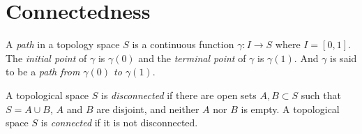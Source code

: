 \documentclass[a4paper,11pt]{article}
\begin{document}
\section{Connectedness}

\begin{defn}
  A \emph{path} in a topology space $S$ is a continuous function
  $\gamma : I\to S$ where $I=[0,1]$.  The \emph{initial point} of
  $\gamma$ is $\gamma(0)$ and the \emph{terminal point} of $\gamma$ is
  $\gamma(1)$.  And $\gamma$ is said to be a \emph{path from
    $\gamma(0)$ to $\gamma(1)$}.
\end{defn}

\begin{defn}
  \label{def:8}
  A topological space $S$ is \emph{disconnected} if there are open
  sets $A, B \subset S$ such that $S = A \cup B$, $A$ and $B$ are
  disjoint, and neither $A$ nor $B$ is empty.  A topological space $S$
  is \emph{connected} if it is not disconnected.
\end{defn}
\end{document}
